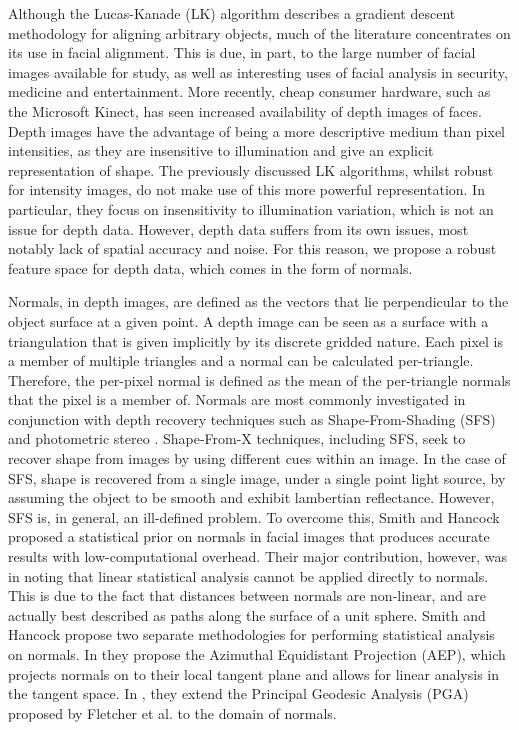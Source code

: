 Although the Lucas-Kanade (LK) algorithm describes a gradient descent methodology for aligning arbitrary objects, much of the literature concentrates on its use in facial alignment. This is due, in part, to the large number of facial images available for study, as well as interesting uses of facial analysis in security, medicine and entertainment. More recently, cheap consumer hardware, such as the Microsoft Kinect, has seen increased availability of depth images of faces. Depth images have the advantage of being a more descriptive medium than pixel intensities, as they are insensitive to illumination and give an explicit representation of shape. The previously discussed LK algorithms, whilst robust for intensity images, do not make use of this more powerful representation. In particular, they focus on insensitivity to illumination variation, which is not an issue for depth data. However, depth data suffers from its own issues, most notably lack of spatial accuracy and noise. For this reason, we propose a robust feature space for depth data, which comes in the form of normals.

Normals, in depth images, are defined as the vectors that lie perpendicular to the object surface at a given point. A depth image can be seen as a surface with a triangulation that is given implicitly by its discrete gridded nature. Each pixel is a member of multiple triangles and a normal can be calculated per-triangle. Therefore, the per-pixel normal is defined as the mean of the per-triangle normals that the pixel is a member of. Normals are most commonly investigated in conjunction with depth recovery techniques such as Shape-From-Shading (SFS) \cite{RefWorks:249, RefWorks:252, RefWorks:270, RefWorks:225} and photometric stereo \cite{RefWorks:268, RefWorks:108}. Shape-From-X techniques, including SFS, seek to recover shape from images by using different cues within an image. In the case of SFS, shape is recovered from a single image, under a single point light source, by assuming the object to be smooth and exhibit lambertian reflectance. However, SFS is, in general, an ill-defined problem. To overcome this, Smith and Hancock \cite{RefWorks:86, RefWorks:90} proposed a statistical prior on normals in facial images that produces accurate results with low-computational overhead. Their major contribution, however, was in noting that linear statistical analysis cannot be applied directly to normals. This is due to the fact that distances between normals are non-linear, and are actually best described as paths along the surface of a unit sphere. Smith and Hancock propose two separate methodologies for performing statistical analysis on normals. In \cite{RefWorks:90} they propose the Azimuthal Equidistant Projection (AEP), which projects normals on to their local tangent plane and allows for linear analysis in the tangent space. In \cite{RefWorks:86}, they extend the Principal Geodesic Analysis (PGA) proposed by Fletcher et al. \cite{RefWorks:100} to the domain of normals.

